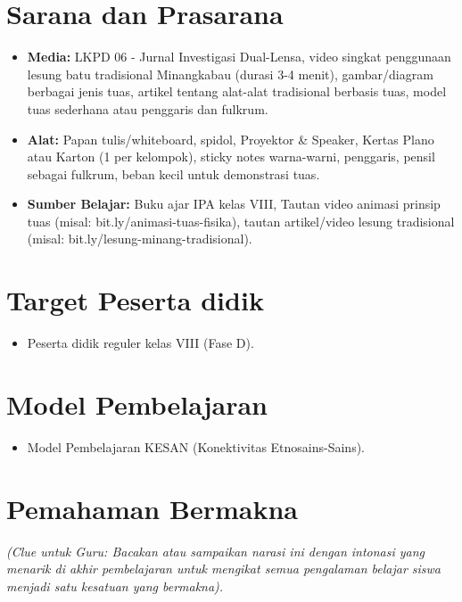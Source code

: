\documentclass[a4paper,12pt]{article}
\begin{document}
\section{Sarana dan Prasarana}

\begin{itemize}
\item \textbf{Media:} LKPD 06 - Jurnal Investigasi Dual-Lensa, video singkat penggunaan lesung batu tradisional Minangkabau (durasi 3-4 menit), gambar/diagram berbagai jenis tuas, artikel tentang alat-alat tradisional berbasis tuas, model tuas sederhana atau penggaris dan fulkrum.
\item \textbf{Alat:} Papan tulis/whiteboard, spidol, Proyektor \& Speaker, Kertas Plano atau Karton (1 per kelompok), sticky notes warna-warni, penggaris, pensil sebagai fulkrum, beban kecil untuk demonstrasi tuas.
\item \textbf{Sumber Belajar:} Buku ajar IPA kelas VIII, Tautan video animasi prinsip tuas (misal: bit.ly/animasi-tuas-fisika), tautan artikel/video lesung tradisional (misal: bit.ly/lesung-minang-tradisional).
\end{itemize}

\section{Target Peserta didik}

\begin{itemize}
\item Peserta didik reguler kelas VIII (Fase D).
\end{itemize}

\section{Model Pembelajaran}

\begin{itemize}
\item Model Pembelajaran KESAN (Konektivitas Etnosains-Sains).
\end{itemize}

\section{Pemahaman Bermakna}
\textit{(Clue untuk Guru: Bacakan atau sampaikan narasi ini dengan intonasi yang menarik di akhir pembelajaran untuk mengikat semua pengalaman belajar siswa menjadi satu kesatuan yang bermakna).}
\end{document}
